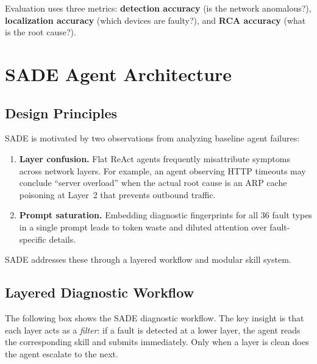 \documentclass[conference]{IEEEtran}
\begin{document}
Evaluation uses three metrics: \textbf{detection accuracy} (is the network anomalous?), \textbf{localization accuracy} (which devices are faulty?), and \textbf{RCA accuracy} (what is the root cause?).

\section{SADE Agent Architecture}
\label{sec:sade}

\subsection{Design Principles}

SADE is motivated by two observations from analyzing baseline agent failures:

\begin{enumerate}    \item \textbf{Layer confusion.} Flat ReAct agents frequently misattribute symptoms across network layers. For example, an agent observing HTTP timeouts may conclude ``server overload'' when the actual root cause is an ARP cache poisoning at Layer~2 that prevents outbound traffic.
    \item \textbf{Prompt saturation.} Embedding diagnostic fingerprints for all 36 fault types in a single prompt leads to token waste and diluted attention over fault-specific details.
\end{enumerate}

SADE addresses these through a layered workflow and modular skill system.

\subsection{Layered Diagnostic Workflow}

The following box shows the SADE diagnostic workflow. The key insight is that each layer acts as a \emph{filter}: if a fault is detected at a lower layer, the agent reads the corresponding skill and submits immediately. Only when a layer is clean does the agent escalate to the next.
\end{document}
